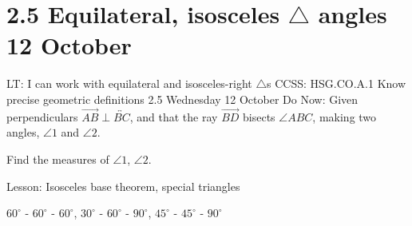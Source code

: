 \section{2.5 Equilateral, isosceles $\triangle$ angles \hfill 12 October}
\begin{frame}{LT: I can work with equilateral and isosceles-right $\triangle$s}
  {CCSS: HSG.CO.A.1 Know precise geometric definitions  \hfill \alert{2.5 Wednesday 12 October}}
  Do Now: Given perpendiculars $\overrightarrow{AB} \perp \overleftrightarrow{BC}$, and that the ray $\overrightarrow{BD}$ bisects $\angle ABC$, making two angles, $\angle 1$ and $\angle 2$. \par \medskip
  Find the measures of $\angle 1$, $\angle 2$.
  \begin{flushleft}
    \end{flushleft}
    Lesson: Isosceles base theorem, special triangles \par $60^\circ$ - $60^\circ$ - $60^\circ$, $30^\circ$ - $60^\circ$ - $90^\circ$, $45^\circ$ - $45^\circ$ - $90^\circ$
  \end{frame}

